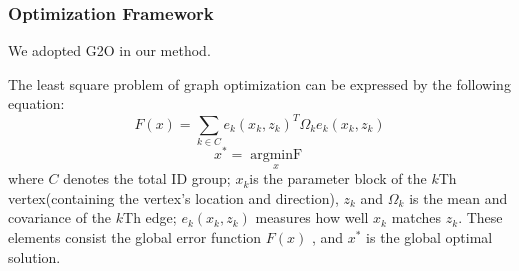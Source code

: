 \documentclass[journal]{IEEEtran}
\begin{document}
\subsubsection{Optimization Framework}
We adopted G2O \citep{K2011G2o} in our method.

The least square problem of graph optimization can be expressed by the following equation:
\[
F(x)=\sum\limits_{k \in C}e_k{(x_k,z_k)}^T{\Omega}_k e_k(x_k,z_k)
\]
\[
x^{*} = \mathop{argminF(x)}\limits_x
\]
where $C$ denotes the total ID group; 
$x_k$is the parameter block of the $k$Th vertex(containing the vertex’s location and direction), $z_k$ and $\Omega_k$ is the mean and covariance of the $k$Th edge; 
$e_k(x_k,z_k)$ measures how well $x_k$ matches $z_k$. 
These elements consist the global error function $F(x)$ , and $x^*$ is the global optimal solution.
\end{document}
